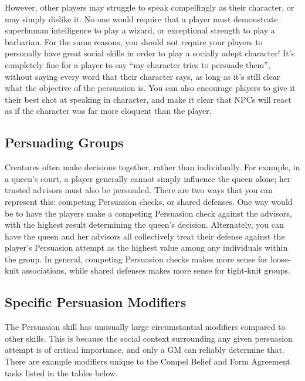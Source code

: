     However, other players may struggle to speak compellingly as their character, or may simply dislike it.
    No one would require that a player must demonstrate superhuman intelligence to play a wizard, or exceptional strength to play a barbarian.
    For the same reasons, you should not require your players to personally have great social skills in order to play a socially adept character!
    It's completely fine for a player to say ``my character tries to persuade them'', without saying every word that their character says, as long as it's still clear what the objective of the persuasion is.
    You can also encourage players to give it their best shot at speaking in character, and make it clear that NPCs will react as if the character was far more eloquent than the player.

    \subsection{Persuading Groups}
        Creatures often make decisions together, rather than individually.
        For example, in a queen's court, a player generally cannot simply influence the queen alone; her trusted advisors must also be persuaded.
        There are two ways that you can represent this: competing Persuasion checks, or shared defenses.
        One way would be to have the players make a competing Persuasion check against the advisors, with the highest result determining the queen's decision.
        Alternately, you can have the queen and her advisors all collectively treat their defense against the player's Persuasion attempt as the highest value among any individuals within the group.
        In general, competing Persuasion checks makes more sense for loose-knit associations, while shared defenses makes more sense for tight-knit groups.

    \subsection{Specific Persuasion Modifiers}
        The Persuasion skill has unusually large circumstantial modifiers compared to other skills.
        This is because the social context surrounding any given persuasion attempt is of critical importance, and only a GM can reliably determine that.
        There are example modifiers unique to the Compel Belief and Form Agreement tasks listed in the tables below.

